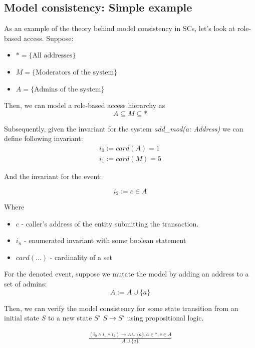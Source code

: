 \documentclass[oneside]{ecsproject}     %
\begin{document}
\newpage
\subsection{Model consistency: Simple example}

As an example of the theory behind model consistency in SCs, let's look at role-based access. Suppose:
\begin{itemize}
  \item $* = \{ \text{All addresses} \}$
  \item $M = \{ \text{Moderators of the system} \}$
  \item $A = \{ \text{Admins of the system} \}$
\end{itemize}

Then, we can model a role-based access hierarchy as 
\[ A \subseteq M \subseteq * \]

Subsequently, given the invariant for the system \textit{add\_mod(a: Address)} we can define following invariant:
\begin{equation*}
    \begin{gathered}
      i_0 := card(A) = 1 \\
      i_1 := card(M) = 5
    \end{gathered}
  \end{equation*}

And the invariant for the event:

$$
i_2 := c \in A
$$

\newpage
Where 
\begin{itemize}
  \item $c$ - caller's address of the entity submitting the transaction.
  \item $i_n$ - enumerated invariant with some boolean statement
  \item $card(...)$ - cardinality of a set
\end{itemize}

For the denoted event, suppose we mutate the model by adding an address to a set of admins:
\begin{equation*}
  A := A \cup \{a\}
\end{equation*}

Then, we can verify the model consistency for some state transition from an initial state $S$ to a new state $S'$ $S \to S'$ using propositional logic.

\begin{equation*}
  \begin{gathered} 
   \frac{(i_0 \wedge i_1 \wedge i_2 ) \rightarrow A \cup \{a\}, a \in *, c \in A}{A \cup \{a\}}
  \end{gathered}
\end{equation*}
\end{document}
